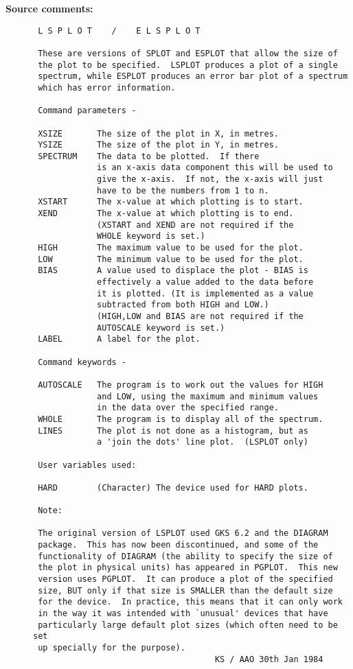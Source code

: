 \begin{description}
\item [{\bf Source comments:}]
\begin{verbatim}
 L S P L O T    /    E L S P L O T

 These are versions of SPLOT and ESPLOT that allow the size of
 the plot to be specified.  LSPLOT produces a plot of a single
 spectrum, while ESPLOT produces an error bar plot of a spectrum
 which has error information.

 Command parameters -

 XSIZE       The size of the plot in X, in metres.
 YSIZE       The size of the plot in Y, in metres.
 SPECTRUM    The data to be plotted.  If there
             is an x-axis data component this will be used to
             give the x-axis.  If not, the x-axis will just
             have to be the numbers from 1 to n.
 XSTART      The x-value at which plotting is to start.
 XEND        The x-value at which plotting is to end.
             (XSTART and XEND are not required if the
             WHOLE keyword is set.)
 HIGH        The maximum value to be used for the plot.
 LOW         The minimum value to be used for the plot.
 BIAS        A value used to displace the plot - BIAS is
             effectively a value added to the data before
             it is plotted. (It is implemented as a value
             subtracted from both HIGH and LOW.)
             (HIGH,LOW and BIAS are not required if the
             AUTOSCALE keyword is set.)
 LABEL       A label for the plot.

 Command keywords -

 AUTOSCALE   The program is to work out the values for HIGH
             and LOW, using the maximum and minimum values
             in the data over the specified range.
 WHOLE       The program is to display all of the spectrum.
 LINES       The plot is not done as a histogram, but as
             a 'join the dots' line plot.  (LSPLOT only)

 User variables used:

 HARD        (Character) The device used for HARD plots.

 Note:

 The original version of LSPLOT used GKS 6.2 and the DIAGRAM
 package.  This has now been discontinued, and some of the
 functionality of DIAGRAM (the ability to specify the size of
 the plot in physical units) has appeared in PGPLOT.  This new
 version uses PGPLOT.  It can produce a plot of the specified
 size, BUT only if that size is SMALLER than the default size
 for the device.  In practice, this means that it can only work
 in the way it was intended with `unusual' devices that have
 particularly large default plot sizes (which often need to be set
 up specially for the purpose).
                                     KS / AAO 30th Jan 1984
\end{verbatim}
\end{description}
